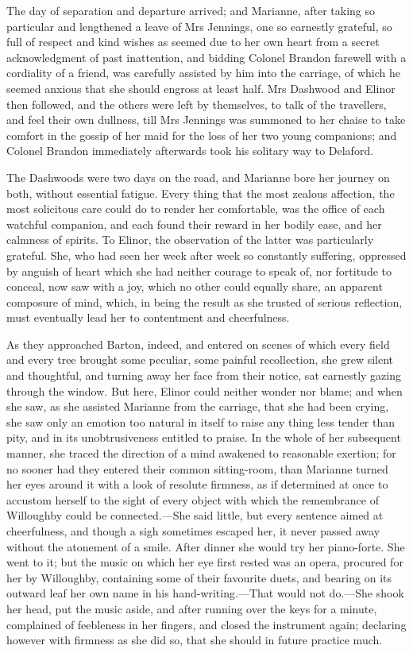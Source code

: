 The day of separation and departure arrived; and Marianne, after taking so particular and lengthened a leave of Mrs Jennings, one so earnestly grateful, so full of respect and kind wishes as seemed due to her own heart from a secret acknowledgment of past inattention, and bidding Colonel Brandon farewell with a cordiality of a friend, was carefully assisted by him into the carriage, of which he seemed anxious that she should engross at least half. Mrs Dashwood and Elinor then followed, and the others were left by themselves, to talk of the travellers, and feel their own dullness, till Mrs Jennings was summoned to her chaise to take comfort in the gossip of her maid for the loss of her two young companions; and Colonel Brandon immediately afterwards took his solitary way to Delaford.

The Dashwoods were two days on the road, and Marianne bore her journey on both, without essential fatigue. Every thing that the most zealous affection, the most solicitous care could do to render her comfortable, was the office of each watchful companion, and each found their reward in her bodily ease, and her calmness of spirits. To Elinor, the observation of the latter was particularly grateful. She, who had seen her week after week so constantly suffering, oppressed by anguish of heart which she had neither courage to speak of, nor fortitude to conceal, now saw with a joy, which no other could equally share, an apparent composure of mind, which, in being the result as she trusted of serious reflection, must eventually lead her to contentment and cheerfulness.

As they approached Barton, indeed, and entered on scenes of which every field and every tree brought some peculiar, some painful recollection, she grew silent and thoughtful, and turning away her face from their notice, sat earnestly gazing through the window. But here, Elinor could neither wonder nor blame; and when she saw, as she assisted Marianne from the carriage, that she had been crying, she saw only an emotion too natural in itself to raise any thing less tender than pity, and in its unobtrusiveness entitled to praise. In the whole of her subsequent manner, she traced the direction of a mind awakened to reasonable exertion; for no sooner had they entered their common sitting-room, than Marianne turned her eyes around it with a look of resolute firmness, as if determined at once to accustom herself to the sight of every object with which the remembrance of Willoughby could be connected.—She said little, but every sentence aimed at cheerfulness, and though a sigh sometimes escaped her, it never passed away without the atonement of a smile. After dinner she would try her piano-forte. She went to it; but the music on which her eye first rested was an opera, procured for her by Willoughby, containing some of their favourite duets, and bearing on its outward leaf her own name in his hand-writing.—That would not do.—She shook her head, put the music aside, and after running over the keys for a minute, complained of feebleness in her fingers, and closed the instrument again; declaring however with firmness as she did so, that she should in future practice much.

